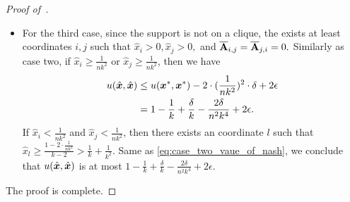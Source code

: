 \begin{proof}[Proof of~]
\begin{itemize}
\begin{align*}
        \end{align*}
        If $\hat{x}_i < \frac{1}{nk^2}$ for any $i \in \mathcal{S}$, then there exists a coordinate $l \not \in \mathcal{S}$ such that $\hat{x}_l > \frac{1 - (m - k + 1)\cdot\frac{1}{nk^2}}{m - (m - k + 1)} \geq \frac{1}{k} + \frac{1}{k^2}.$ Then, considering the utility when playing action $a_l$,
        \begin{align}
            u(\ve_l, \hat{\vx}) &\leq 1 \cdot (1 - \frac{1}{k} - \frac{1}{k^2}) + \delta \cdot (\frac{1}{k} + \frac{1}{k^2}) \notag \\
            & = 1 - \frac{1}{k} + \frac{\delta}{k} - \frac{1}{k^2} + \frac{\delta}{k^2} \notag \\
            &< 1 - \frac{1}{k} + \frac{\delta}{k} - \frac{2\delta}{n^2k^4}, \label{eq:case_two_vaue_of_nash}
        \end{align}
        where in~\eqref{eq:case_two_vaue_of_nash} we used~.
        
        Since the $l$th action is played with positive probability and $(\hat{\vx}, \hat{\vx})$ is an $\epsilon$-well-supported NE, we have $u(\hat{\vx}, \hat{\vx}) \leq u(\ve_l, \hat{\vx}) + \epsilon < 1 - \frac{1}{k} + \frac{\delta}{k} - \frac{2\delta}{n^2k^4} + 2\epsilon.$ 
        \item For the third case, since the support is not on a clique, the exists at least coordinates $i, j$ such that $\hat{x}_i >0, \hat{x}_j>0,$ and $\overline{\mathbf{A}}_{i, j} = \overline{\mathbf{A}}_{j, i} = 0.$ Similarly as case two, if $\hat{x}_i \geq \frac{1}{nk^2}$ or $\hat{x}_j \geq \frac{1}{nk^2}$, then we have  
        \begin{align*}
            u(\hat{{\bm{x}}}, \hat{{\bm{x}}}) &\leq u({\bm{x}}^*, {\bm{x}}^*) - 2\cdot(\frac{1}{nk^2})^2 \cdot \delta + 2 \epsilon\\
            & = 1 - \frac{1}{k} + \frac{\delta}{k} - \frac{2\delta}{ n^2k^4} + 2\epsilon.
        \end{align*}
        If $\hat{x}_i < \frac{1}{nk^2}$ and $\hat{x}_j < \frac{1}{nk^2}$, then there exists an coordinate $l$ such that $\hat{x}_l \geq \frac{1 - 2 \cdot \frac{1}{nk^2}}{k - 2} > \frac{1}{k} + \frac{1}{k^2}.$ Same as \eqref{eq:case_two_vaue_of_nash}, we conclude that $u(\hat{{\bm{x}}}, \hat{{\bm{x}}})$ is at most $1 - \frac{1}{k} + \frac{\delta}{k} - \frac{2\delta}{n^2k^4} + 2\epsilon.$
    \end{itemize}
    The proof is complete.
\end{proof}

